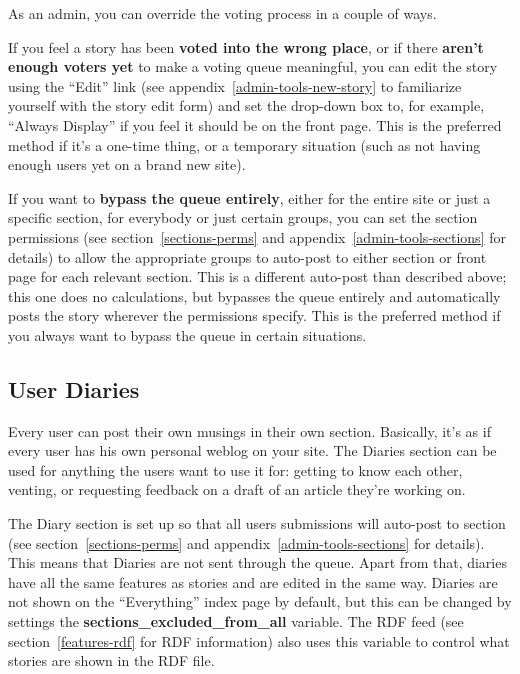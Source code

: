 As an admin, you can override the voting process in a couple of ways.

If you feel a story has been {\bf voted into the wrong place}, or if there {\bf aren't enough voters yet} to make a voting queue meaningful, you can edit the story using the ``Edit'' link (see appendix~\ref{admin-tools-new-story} to familiarize yourself with the story edit form) and set the drop-down box to, for example, ``Always Display'' if you feel it should be on the front page.  This is the preferred method if it's a one-time thing, or a temporary situation (such as not having enough users yet on a brand new site).

If you want to {\bf bypass the queue entirely}, either for the entire site or just a specific section, for everybody or just certain groups, you can set the section permissions (see section~\ref{sections-perms} and appendix~\ref{admin-tools-sections} for details) to allow the appropriate groups to auto-post to either section or front page for each relevant section.  This is a different auto-post than described above; this one does no calculations, but bypasses the queue entirely and automatically posts the story wherever the permissions specify.  This is the preferred method if you always want to bypass the queue in certain situations.

\subsection{User Diaries}
\label{features-diaries}

Every user can post their own musings in their own section.  Basically, it's as if every user has his own personal weblog on your site.  The Diaries section can be used for anything the users want to use it for: getting to know each other, venting, or requesting feedback on a draft of an article they're working on.

The Diary section is set up so that all users submissions will auto-post to section (see section~\ref{sections-perms} and appendix~\ref{admin-tools-sections} for details). This means that Diaries are not sent through the queue. Apart from that, diaries have all the same features as stories and are edited in the same way. Diaries are not shown on the ``Everything'' index page by default, but this can be changed by settings the {\bf sections\_excluded\_from\_all} variable. The RDF feed (see section~\ref{features-rdf} for RDF information) also uses this variable to control what stories are shown in the RDF file.

